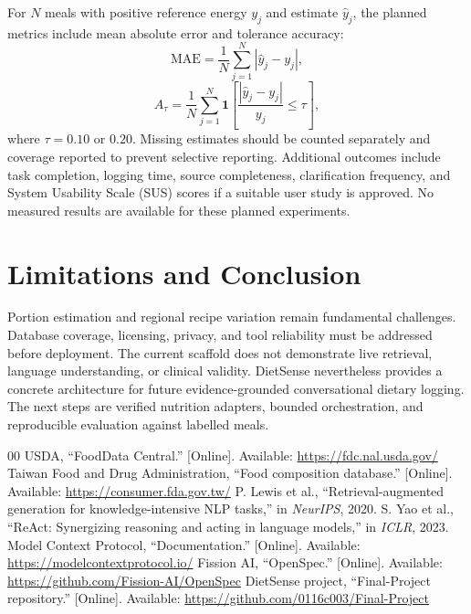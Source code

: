 \documentclass[conference]{IEEEtran}
\begin{document}
For $N$ meals with positive reference energy $y_j$ and estimate $\hat y_j$, the planned metrics include mean absolute error and tolerance accuracy:
\begin{equation} \mathrm{MAE}=\frac{1}{N}\sum_{j=1}^N|\hat y_j-y_j|,\end{equation}
\begin{equation} A_{\tau}=\frac{1}{N}\sum_{j=1}^N\mathbf{1}\left[\frac{|\hat y_j-y_j|}{y_j}\leq\tau\right],\end{equation}
where $\tau=0.10$ or $0.20$. Missing estimates should be counted separately and coverage reported to prevent selective reporting. Additional outcomes include task completion, logging time, source completeness, clarification frequency, and System Usability Scale (SUS) scores if a suitable user study is approved. No measured results are available for these planned experiments.
\section{Limitations and Conclusion}
Portion estimation and regional recipe variation remain fundamental challenges. Database coverage, licensing, privacy, and tool reliability must be addressed before deployment. The current scaffold does not demonstrate live retrieval, language understanding, or clinical validity. DietSense nevertheless provides a concrete architecture for future evidence-grounded conversational dietary logging. The next steps are verified nutrition adapters, bounded orchestration, and reproducible evaluation against labelled meals.
\begin{thebibliography}{00}
 USDA, ``FoodData Central.'' [Online]. Available: \url{https://fdc.nal.usda.gov/}
 Taiwan Food and Drug Administration, ``Food composition database.'' [Online]. Available: \url{https://consumer.fda.gov.tw/}
 P. Lewis et al., ``Retrieval-augmented generation for knowledge-intensive NLP tasks,'' in \emph{NeurIPS}, 2020.
 S. Yao et al., ``ReAct: Synergizing reasoning and acting in language models,'' in \emph{ICLR}, 2023.
 Model Context Protocol, ``Documentation.'' [Online]. Available: \url{https://modelcontextprotocol.io/}
 Fission AI, ``OpenSpec.'' [Online]. Available: \url{https://github.com/Fission-AI/OpenSpec}
 DietSense project, ``Final-Project repository.'' [Online]. Available: \url{https://github.com/0116c003/Final-Project}
\end{thebibliography}
\end{document}
